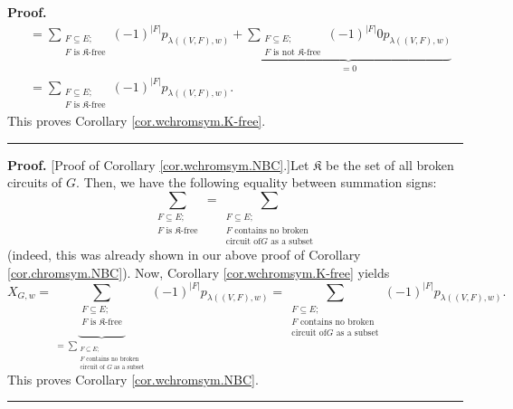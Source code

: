 \documentclass[numbers=enddot,12pt,final,onecolumn,notitlepage]{scrartcl}%
\theoremstyle{definition}
\newenvironment{proof}[1][Proof]{\noindent\textbf{#1.} }{\ \rule{0.5em}{0.5em}}
\newenvironment{verlong}{}{}
\let\sumnonlimits\sum
\renewcommand{\sum}{\sumnonlimits\limits}
\begin{document}
\begin{verlong}
\begin{proof}
\begin{align*}
&  =\sum_{\substack{F\subseteq E;\\F\text{ is }\mathfrak{K}\text{-free}%
}}\left(  -1\right)  ^{\left\vert F\right\vert }p_{\lambda\left(  \left(
V,F\right)  ,w\right)  }+\underbrace{\sum_{\substack{F\subseteq E;\\F\text{ is
not }\mathfrak{K}\text{-free}}}\left(  -1\right)  ^{\left\vert F\right\vert
}0p_{\lambda\left(  \left(  V,F\right)  ,w\right)  }}_{=0}\\
&  =\sum_{\substack{F\subseteq E;\\F\text{ is }\mathfrak{K}\text{-free}%
}}\left(  -1\right)  ^{\left\vert F\right\vert }p_{\lambda\left(  \left(
V,F\right)  ,w\right)  }.
\end{align*}
This proves Corollary \ref{cor.wchromsym.K-free}.
\end{proof}

\begin{proof}
[Proof of Corollary \ref{cor.wchromsym.NBC}.]Let $\mathfrak{K}$ be the set of
all broken circuits of $G$. Then, we have the following equality between
summation signs:
\[
\sum_{\substack{F\subseteq E;\\F\text{ is }\mathfrak{K}\text{-free}}%
}=\sum_{\substack{F\subseteq E;\\F\text{ contains no broken}\\\text{circuit of
}G\text{ as a subset}}}
\]
(indeed, this was already shown in our above proof of Corollary
\ref{cor.chromsym.NBC}). Now, Corollary \ref{cor.wchromsym.K-free} yields%
\[
X_{G,w}=\underbrace{\sum_{\substack{F\subseteq E;\\F\text{ is }\mathfrak{K}%
\text{-free}}}}_{=\sum_{\substack{F\subseteq E;\\F\text{ contains no
broken}\\\text{circuit of }G\text{ as a subset}}}}\left(  -1\right)
^{\left\vert F\right\vert }p_{\lambda\left(  \left(  V,F\right)  ,w\right)
}=\sum_{\substack{F\subseteq E;\\F\text{ contains no broken}\\\text{circuit of
}G\text{ as a subset}}}\left(  -1\right)  ^{\left\vert F\right\vert
}p_{\lambda\left(  \left(  V,F\right)  ,w\right)  }.
\]
This proves Corollary \ref{cor.wchromsym.NBC}.
\end{proof}


\end{verlong}
\end{document}

